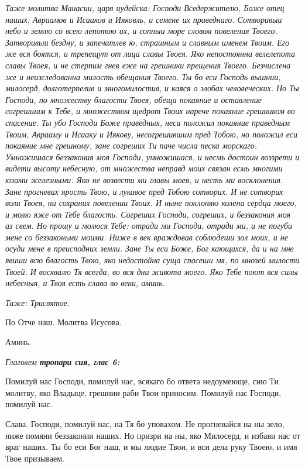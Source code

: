 \itshape Таже молитва Манасии, царя иудейска:\normalfont{} Господи Вседержителю, Боже отец наших, Авраамов и Исааков и Ияковль, и семене их праведнаго. Сотворивыи небо и землю со всею лепотою их, и сопныи море словом повеления Твоего. Затворивыи бездну, и запечатлев ю, страшным и славным именем Твоим. Его же вся боятся, и трепещут от лица славы Твоея. Яко непостоянна велелепота славы Твоея, и не стерпим гнев еже на грешники прещения Твоего. Безчислена же и неизследованна милость обещания Твоего. Ты бо еси Господь вышнии, милосерд, долготерпелив и многомилостив, и каяся о злобах человеческих. Но Ты Господи, по множеству благости Твоея, обеща покаяние и оставление согрешшим к Тебе, и множеством щедрот Твоих нарече покаяние грешником во спасение. Ты убо Господи Боже праведных, неси положил покаяние праведным Твоим, Аврааму и Исааку и Иякову, несогрешившим пред Тобою, но положил еси покаяние мне грешному, зане согреших Ти паче числа песка морскаго. Умножишася беззакония моя Господи, умножишася, и несмь достоин воззрети и видети высоту небесную, от множества неправд моих связан есмь многими юзами железными. Яко не возвести ми главы моея, и несть ми восклонения. Зане прогневах ярость Твою, и лукавое пред Тобою сотворих. И не сотворих воли Твоея, ни сохраних повелении Твоих. И ныне поклоняю колена сердца моего, и молю яже от Тебе благость. Согреших Господи, согреших, и беззакония моя аз свем. Но прошу и молюся Тебе: отради ми Господи, отради ми, и не погуби мене со беззаконьми моими. Ниже в век враждовав соблюдеши зол моих, и не осуди мене в преисподних земли. Зане Ты еси Боже, Бог кающихся, да и на мне явиши всю благость Твою, яко недостойна суща спасеши мя, по мнозей милости Твоей. И восхвалю Тя всегда, во вся дни живота моего. Яко Тебе поют вся силы небесныя, и Твоя есть слава во веки, аминь.


\itshape Таже: Трисвятое. 

По Отче наш. Молитва Исусова.\normalfont{}

Аминь.


\medskip


\itshape Глаголем \bfseries тропари сия, глас 6:\normalfont{}\normalfont{}


Помилуй нас Господи, помилуй нас, всякаго бо ответа недоумеюще, сию Ти молитву, яко Владыце, грешнии раби Твои приносим. Помилуй нас Господи, помилуй нас.

Слава. Господи, помилуй нас, на Тя бо уповахом. Не прогневайся на ны зело, ниже помяни беззаконии наших. Но призри на ны, яко Милосерд, и избави нас от враг наших. Ты бо еси Бог наш, и мы людие Твои, и вси дела руку Твоею, и имя Твое призываем.

